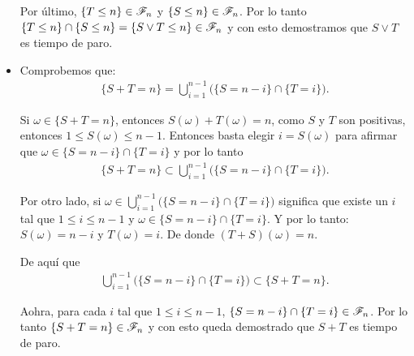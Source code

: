 \begin{itemize}
			Por último, $\{ T \leq n \} \in \mathscr{F}_n$ y $\{ S \leq n \} \in \mathscr{F}_n$. Por lo tanto	\\	
			$\{ T \leq n \} \cap \{ S \leq n\} = \{ S \vee T \leq n \} \in \mathscr{F}_n$ y con esto demostramos que 
			$ S \vee T$ es tiempo de paro.\\
			
		\item
			Comprobemos que:
			\begin{align}
				\{ S + T = n \} = \bigcup_{i = 1}^{n-1} \bigg( \{S = n - i\} \cap \{T = i\} \bigg).
			\end{align}
			
			Si $\omega \in \{ S + T = n \}$, entonces $S(\omega) + T(\omega) = n$, como $S$ y $T$ son positivas,
			entonces $1 \leq S(\omega) \leq n-1$. Entonces basta elegir $i = S(\omega)$ para afirmar que 
			$\omega \in \{S = n - i\} \cap \{T = i\}$ y por lo tanto
			\begin{align}
			\{ S + T = n \} \subset \bigcup_{i = 1}^{n-1} \bigg( \{S = n - i\} \cap \{T = i\} \bigg).
			\end{align}
			
			Por otro lado, si $\omega \in \bigcup_{i = 1}^{n-1} \bigg( \{S = n - i\} \cap \{T = i\} \bigg)$
			significa que existe un $i$ tal que $1\leq i \leq n-1$ y $\omega \in \{S = n - i\} \cap \{T = i\}$.
			Y por lo tanto: $S(\omega) = n-i$ y $T(\omega) = i$. De donde $(T + S)(\omega) = n$.
			
			De aquí que
			\begin{align}
				\bigcup_{i = 1}^{n-1} \bigg( \{S = n - i\} \cap \{T = i\} \bigg) \subset \{ S + T = n \}. 
			\end{align}
			
			Aohra, para cada $i$ tal que $1 \leq i \leq n-1$, $\{S = n - i\} \cap \{T = i\} \in \mathscr{F}_n$.
			Por lo tanto $\{ S + T = n\} \in \mathscr{F}_n$ y con esto queda demostrado que $ S + T $ es tiempo de paro.
	\end{itemize}
	